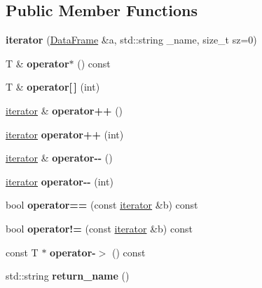\subsection*{Public Member Functions}
\begin{DoxyCompactItemize}
\item 
\mbox{\label{classDataFrame_1_1iterator_a627152ab35bbd9d1a8c389dd17077b6b}} 
{\bfseries iterator} (\hyperlink{classDataFrame}{Data\+Frame} \&a, std\+::string \+\_\+name, size\+\_\+t sz=0)
\item 
\mbox{\label{classDataFrame_1_1iterator_a5f4ac677abe570ec5548c82e83386e53}} 
T \& {\bfseries operator$\ast$} () const
\item 
\mbox{\label{classDataFrame_1_1iterator_ace9903873ac70b559b0a49b3b45fc652}} 
T \& {\bfseries operator\mbox{[}$\,$\mbox{]}} (int)
\item 
\mbox{\label{classDataFrame_1_1iterator_a6d0d68df5392b13e8806ab7cbd73bcb9}} 
\hyperlink{classDataFrame_1_1iterator}{iterator} \& {\bfseries operator++} ()
\item 
\mbox{\label{classDataFrame_1_1iterator_a1b32fef37570ff0f6eff4b382efed79a}} 
\hyperlink{classDataFrame_1_1iterator}{iterator} {\bfseries operator++} (int)
\item 
\mbox{\label{classDataFrame_1_1iterator_aff4a1dca317079a6018984d881ad5ab8}} 
\hyperlink{classDataFrame_1_1iterator}{iterator} \& {\bfseries operator-\/-\/} ()
\item 
\mbox{\label{classDataFrame_1_1iterator_ab5d38e9c2805e99d3b6e1321311a213b}} 
\hyperlink{classDataFrame_1_1iterator}{iterator} {\bfseries operator-\/-\/} (int)
\item 
\mbox{\label{classDataFrame_1_1iterator_aff9d9adb908ded766a554a7189e6b095}} 
bool {\bfseries operator==} (const \hyperlink{classDataFrame_1_1iterator}{iterator} \&b) const
\item 
\mbox{\label{classDataFrame_1_1iterator_a8aa5d5575c247f7d27ae0bcbc43da16b}} 
bool {\bfseries operator!=} (const \hyperlink{classDataFrame_1_1iterator}{iterator} \&b) const
\item 
\mbox{\label{classDataFrame_1_1iterator_adb9192f797a6d3da1c2860d0a48d6984}} 
const T $\ast$ {\bfseries operator-\/$>$} () const
\item 
\mbox{\label{classDataFrame_1_1iterator_a8a13fe0c1be635f4ace1c6a2106c9b71}} 
std\+::string {\bfseries return\+\_\+name} ()
\end{DoxyCompactItemize}
